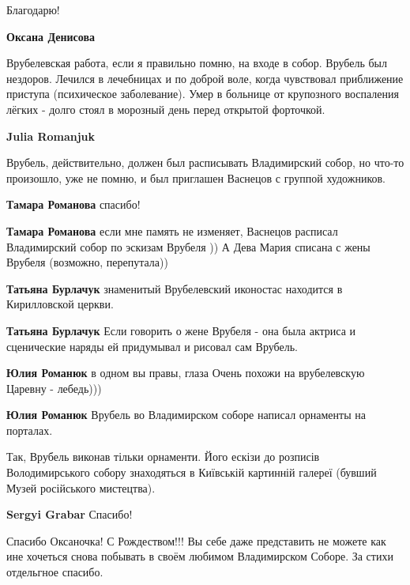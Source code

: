 \begin{itemize}
\begin{itemize}
\begin{itemize}
Благодарю!

\textbf{Оксана Денисова} 

Врубелевская работа, если я правильно помню, на входе в собор. Врубель был
нездоров. Лечился в лечебницах и по доброй воле, когда чувствовал приближение
приступа (психическое заболевание). Умер в больнице от крупозного воспаления
лёгких - долго стоял в морозный день перед открытой форточкой.

\end{itemize} %

\textbf{Julia Romanjuk} 

Врубель, действительно, должен был расписывать Владимирский собор, но что-то
произошло, уже не помню, и был приглашен Васнецов с группой художников.

\begin{itemize} %
\textbf{Тамара Романова} спасибо!

\textbf{Тамара Романова} если мне память не изменяет, Васнецов расписал Владимирский собор по эскизам Врубеля ))
А Дева Мария списана с жены Врубеля (возможно, перепутала))

\textbf{Татьяна Бурлачук} знаменитый Врубелевский иконостас находится в Кирилловской церкви.

\textbf{Татьяна Бурлачук} Если говорить о жене Врубеля - она была актриса и сценические наряды ей придумывал и рисовал сам Врубель.
\end{itemize} %

\textbf{Юлия Романюк} в одном вы правы, глаза
Очень похожи на врубелевскую Царевну - лебедь)))

\textbf{Юлия Романюк} Врубель во Владимирском соборе написал орнаменты на порталах.


Так, Врубель виконав тільки орнаменти. Його ескізи до розписів Володимирського
собору знаходяться в Київській картинній галереї (бувший Музей російського
мистецтва).


\textbf{Sergyi Grabar} Спасибо!

\end{itemize} %


Спасибо Оксаночка! С Рождеством!!! Вы себе даже представить не можете как ине
хочеться снова побывать в своём любимом Владимирском Соборе. За стихи
отдельгное спасибо.


\end{itemize}
